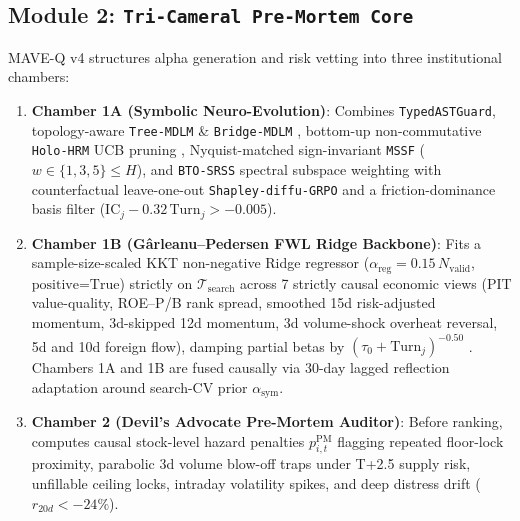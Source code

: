\documentclass[11pt]{article}
\begin{document}
\subsection{Module 2: \texttt{Tri-Cameral Pre-Mortem Core}}
MAVE-Q v4 structures alpha generation and risk vetting into three institutional chambers:
\begin{enumerate}[leftmargin=1.4em]
  \item \textbf{Chamber 1A (Symbolic Neuro-Evolution)}: Combines \texttt{TypedASTGuard}, topology-aware \texttt{Tree-MDLM} \& \texttt{Bridge-MDLM} \citep{sahoo2024mdlm,peebles2023dit}, bottom-up non-commutative \texttt{Holo-HRM} UCB pruning \citep{wang2025hrm}, Nyquist-matched sign-invariant \texttt{MSSF} ($w \in \{1,3,5\} \le H$), and \texttt{BTO-SRSS} spectral subspace weighting \citep{ledoit2004shrinkage} with counterfactual leave-one-out \texttt{Shapley-diffu-GRPO} and a friction-dominance basis filter ($\text{IC}_j - 0.32\,\text{Turn}_j > -0.005$).
  \item \textbf{Chamber 1B (G\^arleanu--Pedersen FWL Ridge Backbone)}: Fits a sample-size-scaled KKT non-negative Ridge regressor ($\alpha_{\text{reg}} = 0.15\,N_{\text{valid}}$, $\text{positive=True}$) strictly on $\mathcal{T}_{\text{search}}$ across 7 strictly causal economic views (PIT value-quality, ROE--P/B rank spread, smoothed 15d risk-adjusted momentum, 3d-skipped 12d momentum, 3d volume-shock overheat reversal, 5d and 10d foreign flow), damping partial betas by $(\tau_0 + \text{Turn}_j)^{-0.50}$ \citep{garleanu2013dynamic}. Chambers 1A and 1B are fused causally via 30-day lagged reflection adaptation around search-CV prior $\alpha_{\text{sym}}$.
  \item \textbf{Chamber 2 (Devil's Advocate Pre-Mortem Auditor)}: Before ranking, computes causal stock-level hazard penalties $p^{\text{PM}}_{i,t}$ flagging repeated floor-lock proximity, parabolic 3d volume blow-off traps under T+2.5 supply risk, unfillable ceiling locks, intraday volatility spikes, and deep distress drift ($r_{20d} < -24\%$).
\end{enumerate}
\end{document}

